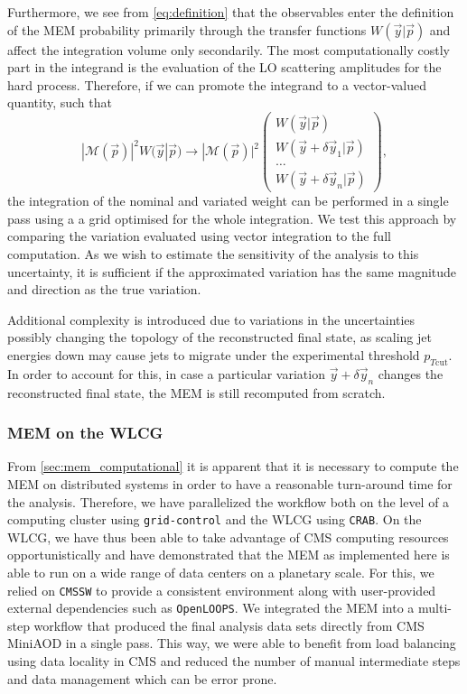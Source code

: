 Furthermore, we see from \cref{eq:definition} that the observables enter the definition of the MEM probability primarily through the transfer functions $W(\vec{y} | \vec{p})$ and affect the integration volume only secondarily. The most computationally costly part in the integrand is the evaluation of the LO scattering amplitudes for the hard process. Therefore, if we can promote the integrand to a vector-valued quantity, such that
\begin{equation}
|\mathcal{M}(\vec{p})|^2 W(\vec{y} | \vec{p}) \rightarrow |\mathcal{M}(\vec{p})|^2  \begin{pmatrix}
  W(\vec{y} | \vec{p}) \\
  W(\vec{y} + \delta \vec{y}_1 | \vec{p}) \\
  \dots \\
  W(\vec{y} + \delta \vec{y}_n | \vec{p})
 \end{pmatrix},
\end{equation}
the integration of the nominal and variated weight can be performed in a single pass using a a grid optimised for the whole integration. We test this approach by comparing the variation evaluated using vector integration to the full computation. As we wish to estimate the sensitivity of the analysis to this uncertainty, it is sufficient if the approximated variation has the same magnitude and direction as the true variation.

Additional complexity is introduced due to variations in the uncertainties possibly changing the topology of the reconstructed final state, as scaling jet energies down may cause jets to migrate under the experimental threshold $p_{T\mathrm{cut}}$. In order to account for this, in case a particular variation $\vec{y} + \delta \vec{y}_n$ changes the reconstructed final state, the MEM is still recomputed from scratch.

\subsubsection{MEM on the WLCG}

From \cref{sec:mem_computational} it is apparent that it is necessary to compute the MEM on distributed systems in order to have a reasonable turn-around time for the analysis. Therefore, we have parallelized the workflow both on the level of a computing cluster using \texttt{grid-control} and the WLCG using \texttt{CRAB}. On the WLCG, we have thus been able to take advantage of CMS computing resources opportunistically and have demonstrated that the MEM as implemented here is able to run on a wide range of data centers on a planetary scale. For this, we relied on \texttt{CMSSW} to provide a consistent environment along with user-provided external dependencies such as \texttt{OpenLOOPS}. We integrated the MEM into a multi-step workflow that produced the final analysis data sets directly from CMS MiniAOD in a single pass. This way, we were able to benefit from load balancing using data locality in CMS and reduced the number of manual intermediate steps and data management which can be error prone.

